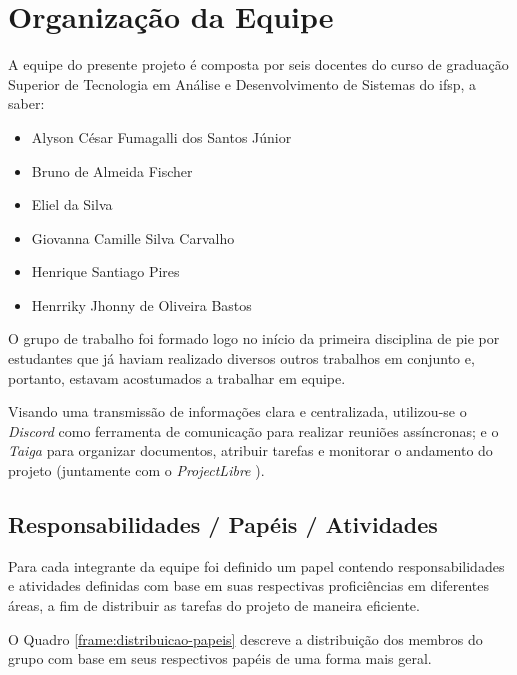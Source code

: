 \section{Organização da Equipe}

A equipe do presente projeto é composta por seis docentes do curso de graduação Superior de Tecnologia em Análise e Desenvolvimento de Sistemas do \gls{ifsp}, a saber:

\begin{itemize}
	\item Alyson César Fumagalli dos Santos Júnior
	\item Bruno de Almeida Fischer
	\item Eliel da Silva
	\item Giovanna Camille Silva Carvalho
	\item Henrique Santiago Pires
	\item Henrriky Jhonny de Oliveira Bastos
\end{itemize}

O grupo de trabalho foi formado logo no início da primeira disciplina de \gls{pie} por estudantes que já haviam realizado diversos outros trabalhos em conjunto e, portanto, estavam acostumados a trabalhar em equipe.

Visando uma transmissão de informações clara e centralizada, utilizou-se o \emph{Discord} \cite{discord-2025} como ferramenta de comunicação para realizar reuniões assíncronas; e o \emph{Taiga} \cite{taiga-2025} para organizar documentos, atribuir tarefas e monitorar o andamento do projeto (juntamente com o \emph{ProjectLibre} \cite{projectlibre-2025}).

\subsection{Responsabilidades / Papéis / Atividades}
\label{subsec:papeis-equipe}

Para cada integrante da equipe foi definido um papel contendo responsabilidades e atividades definidas com base em suas respectivas proficiências em diferentes áreas, a fim de distribuir as tarefas do projeto de maneira eficiente.

O Quadro \ref{frame:distribuicao-papeis} descreve a distribuição dos membros do grupo com base em seus respectivos papéis de uma forma mais geral.

